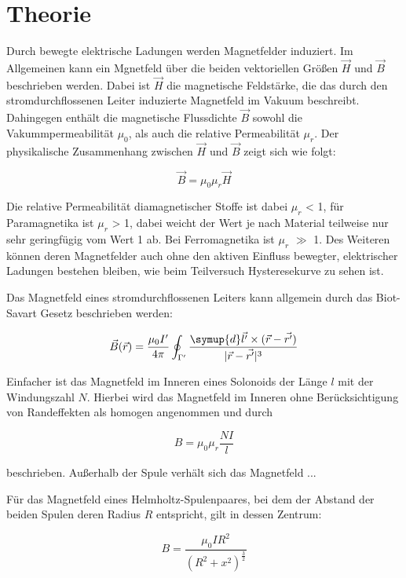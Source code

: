\section{Theorie}
\label{sec:Theorie}


\cite{sample}


Durch bewegte elektrische Ladungen werden Magnetfelder induziert.
Im Allgemeinen kann ein Mgnetfeld über die beiden vektoriellen Größen 
$\vec H$ und $\vec B$ beschrieben werden. Dabei ist $\vec H$ die 
magnetische Feldstärke, die das durch den stromdurchflossenen Leiter induzierte 
Magnetfeld im Vakuum beschreibt. Dahingegen enthält die magnetische Flussdichte
$\vec B$ sowohl die Vakummpermeabilität $\mu_0$, als auch die relative Permeabilität
$\mu_r$. Der physikalische Zusammenhang zwischen $\vec H$ und $\vec B$ zeigt sich wie folgt:

\begin{equation}
    \vec B = \mu_0 \mu_r \vec H
\end{equation}

Die relative Permeabilität diamagnetischer Stoffe ist dabei $\mu_r$ < 1, für 
Paramagnetika ist $\mu_r$ > 1, dabei weicht der Wert je nach Material teilweise 
nur sehr geringfügig vom Wert 1 ab. Bei Ferromagnetika ist $\mu_r$ $\gg$ 1. Des Weiteren
können deren Magnetfelder auch ohne den aktiven Einfluss bewegter, elektrischer Ladungen
bestehen bleiben, wie beim Teilversuch Hysteresekurve zu sehen ist.

Das Magnetfeld eines stromdurchflossenen Leiters kann allgemein durch das Biot-Savart Gesetz
beschrieben werden:

\begin{equation}
    \vec{B}(\vec r) = \frac{\mu_0 I'}{4\pi} \oint_{\Gamma'} \frac{\symup{d}\vec{l'}\times (\vec{r}-\vec{r'})}{\lvert\vec{r}-\vec{r'}\rvert^3}
\end{equation}

Einfacher ist das Magnetfeld im Inneren eines Solonoids der Länge $l$ 
mit der Windungszahl $N$. Hierbei wird das Magnetfeld im Inneren ohne
Berücksichtigung von Randeffekten als homogen angenommen und durch 

\begin{equation}
    B = \mu_0 \mu_r \frac{NI}l 
\end{equation}

beschrieben. Außerhalb der Spule verhält sich das Magnetfeld ...

Für das Magnetfeld eines Helmholtz-Spulenpaares, bei dem der Abstand der beiden 
Spulen deren Radius $R$ entspricht, gilt in dessen Zentrum:

\begin{equation}
    B = \frac{\mu_0 I R^2}{({R^2}+{x^2})^\frac{3}2}
\end{equation}


